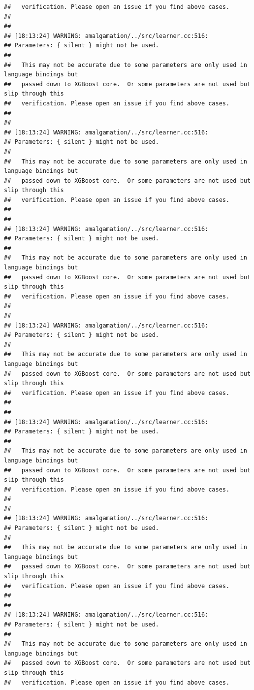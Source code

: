 \documentclass[AMS,STIX2COL]{WileyNJD-v2}\usepackage[]{graphicx}\usepackage[]{color}
\makeatletter
\newenvironment{kframe}{%
 \def\at@end@of@kframe{}%
 \ifinner\ifhmode%
  \def\at@end@of@kframe{\end{minipage}}%
  \begin{minipage}{\columnwidth}%
 \fi\fi%
 \def\FrameCommand##1{\hskip\@totalleftmargin \hskip-\fboxsep
 \colorbox{shadecolor}{##1}\hskip-\fboxsep
     \hskip-\linewidth \hskip-\@totalleftmargin \hskip\columnwidth}%
 \MakeFramed {\advance\hsize-\width
   \@totalleftmargin\z@ \linewidth\hsize
   \@setminipage}}%
 {\par\unskip\endMakeFramed%
 \at@end@of@kframe}
\newenvironment{knitrout}{}{} %
\makeatother
\begin{document}
\begin{knitrout}
\begin{kframe}
\begin{verbatim}
##   verification. Please open an issue if you find above cases.
## 
## 
## [18:13:24] WARNING: amalgamation/../src/learner.cc:516: 
## Parameters: { silent } might not be used.
## 
##   This may not be accurate due to some parameters are only used in language bindings but
##   passed down to XGBoost core.  Or some parameters are not used but slip through this
##   verification. Please open an issue if you find above cases.
## 
## 
## [18:13:24] WARNING: amalgamation/../src/learner.cc:516: 
## Parameters: { silent } might not be used.
## 
##   This may not be accurate due to some parameters are only used in language bindings but
##   passed down to XGBoost core.  Or some parameters are not used but slip through this
##   verification. Please open an issue if you find above cases.
## 
## 
## [18:13:24] WARNING: amalgamation/../src/learner.cc:516: 
## Parameters: { silent } might not be used.
## 
##   This may not be accurate due to some parameters are only used in language bindings but
##   passed down to XGBoost core.  Or some parameters are not used but slip through this
##   verification. Please open an issue if you find above cases.
## 
## 
## [18:13:24] WARNING: amalgamation/../src/learner.cc:516: 
## Parameters: { silent } might not be used.
## 
##   This may not be accurate due to some parameters are only used in language bindings but
##   passed down to XGBoost core.  Or some parameters are not used but slip through this
##   verification. Please open an issue if you find above cases.
## 
## 
## [18:13:24] WARNING: amalgamation/../src/learner.cc:516: 
## Parameters: { silent } might not be used.
## 
##   This may not be accurate due to some parameters are only used in language bindings but
##   passed down to XGBoost core.  Or some parameters are not used but slip through this
##   verification. Please open an issue if you find above cases.
## 
## 
## [18:13:24] WARNING: amalgamation/../src/learner.cc:516: 
## Parameters: { silent } might not be used.
## 
##   This may not be accurate due to some parameters are only used in language bindings but
##   passed down to XGBoost core.  Or some parameters are not used but slip through this
##   verification. Please open an issue if you find above cases.
## 
## 
## [18:13:24] WARNING: amalgamation/../src/learner.cc:516: 
## Parameters: { silent } might not be used.
## 
##   This may not be accurate due to some parameters are only used in language bindings but
##   passed down to XGBoost core.  Or some parameters are not used but slip through this
##   verification. Please open an issue if you find above cases.

\end{verbatim}
\end{kframe}
\end{knitrout}
\end{document}
